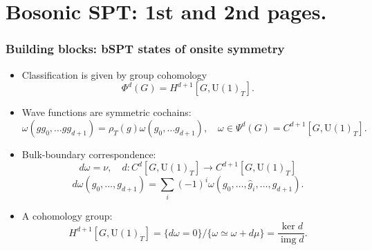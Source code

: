 \documentclass[xcolor=table, 10pt, aspectratio=43]{beamer}
\newcommand{\uone}{\mathrm U(1)}
\DeclareMathOperator{\img}{img}
\begin{document}
\section{Bosonic SPT: 1st and 2nd pages.}

\begin{frame}
  \frametitle{Building blocks: bSPT states of onsite symmetry}
  \begin{itemize}
    \item Classification is given by group cohomology
    \[\Phi^d(G) = H^{d+1}[G, \uone_T].\]
		\item Wave functions are symmetric cochains:
		\[\omega(gg_0,\ldots gg_{d+1})=\rho_T(g)\omega(g_0,\ldots g_{d+1}),\quad
		\omega\in\Psi^d(G) = C^{d+1}[G, \uone_T].\]
		\item Bulk-boundary correspondence:
		\[d\omega = \nu,\quad d:C^d[G, \uone_T]\rightarrow C^{d+1}[G, \uone_T]\]
		\[d\omega(g_0,\ldots,g_{d+1})
		=\sum_i(-1)^i\omega(g_0,\ldots,\hat g_i,\ldots,g_{d+1}).\]
\begin{center}
\end{center}
  \item A cohomology group:
\[H^{d+1}[G,\uone_T]=\{d\omega=0\}/\{\omega\simeq\omega+d\mu\}=\frac{\ker d}{\img d}.\]
  \end{itemize}
\end{frame}
\end{document}
